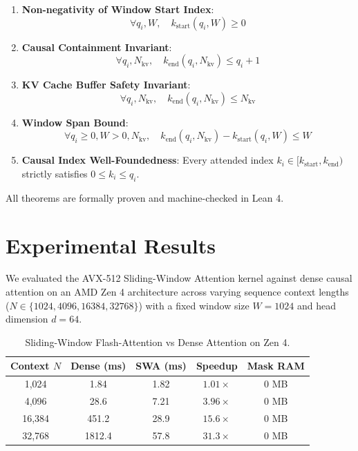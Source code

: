 \documentclass[10pt,twocolumn,letterpaper]{article}
\begin{document}
\begin{enumerate}
    \item \textbf{Non-negativity of Window Start Index}:
    \begin{equation}
    \forall q_i, W, \quad k_{\text{start}}(q_i, W) \ge 0
    \end{equation}
    \item \textbf{Causal Containment Invariant}:
    \begin{equation}
    \forall q_i, N_{\text{kv}}, \quad k_{\text{end}}(q_i, N_{\text{kv}}) \le q_i + 1
    \end{equation}
    \item \textbf{KV Cache Buffer Safety Invariant}:
    \begin{equation}
    \forall q_i, N_{\text{kv}}, \quad k_{\text{end}}(q_i, N_{\text{kv}}) \le N_{\text{kv}}
    \end{equation}
    \item \textbf{Window Span Bound}:
    \begin{equation}
    \forall q_i \ge 0, W > 0, N_{\text{kv}}, \quad k_{\text{end}}(q_i, N_{\text{kv}}) - k_{\text{start}}(q_i, W) \le W
    \end{equation}
    \item \textbf{Causal Index Well-Foundedness}:
    Every attended index $k_i \in [k_{\text{start}}, k_{\text{end}})$ strictly satisfies $0 \le k_i \le q_i$.
\end{enumerate}

All theorems are formally proven and machine-checked in Lean 4.

\section{Experimental Results}

We evaluated the AVX-512 Sliding-Window Attention kernel against dense causal attention on an AMD Zen 4 architecture across varying sequence context lengths ($N \in \{1024, 4096, 16384, 32768\}$) with a fixed window size $W = 1024$ and head dimension $d = 64$.

\begin{table}[h]
\centering
\caption{Sliding-Window Flash-Attention vs Dense Attention on Zen 4.}
\small
\begin{tabular}{@{}ccccc@{}}
\toprule
Context $N$ & Dense (ms) & SWA (ms) & Speedup & Mask RAM \\
\midrule
1,024  & 1.84   & 1.82 & $1.01\times$ & 0 MB \\
4,096  & 28.6   & 7.21 & $3.96\times$ & 0 MB \\
16,384 & 451.2  & 28.9 & $15.6\times$ & 0 MB \\
32,768 & 1812.4 & 57.8 & $31.3\times$ & 0 MB \\
\bottomrule
\end{tabular}
\end{table}
\end{document}
